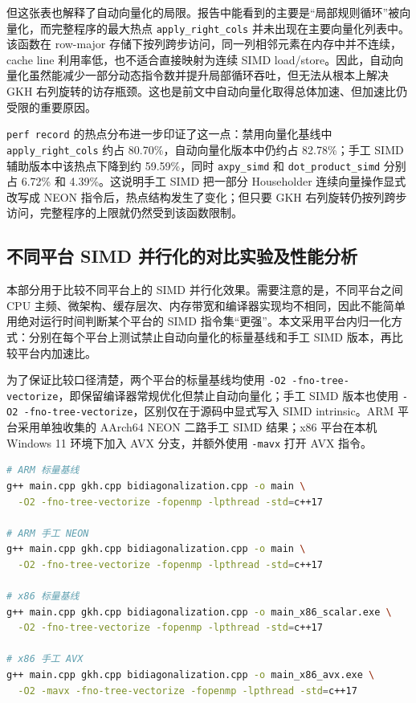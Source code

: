 \documentclass[UTF8,a4paper]{ctexart}
\begin{document}
但这张表也解释了自动向量化的局限。报告中能看到的主要是“局部规则循环”被向量化，而完整程序的最大热点 \texttt{apply\_right\_cols} 并未出现在主要向量化列表中。该函数在 row-major 存储下按列跨步访问，同一列相邻元素在内存中并不连续，cache line 利用率低，也不适合直接映射为连续 SIMD load/store。因此，自动向量化虽然能减少一部分动态指令数并提升局部循环吞吐，但无法从根本上解决 GKH 右列旋转的访存瓶颈。这也是前文中自动向量化取得总体加速、但加速比仍受限的重要原因。

\texttt{perf record} 的热点分布进一步印证了这一点：禁用向量化基线中 \texttt{apply\_right\_cols} 约占 80.70\%，自动向量化版本中仍约占 82.78\%；手工 SIMD 辅助版本中该热点下降到约 59.59\%，同时 \texttt{axpy\_simd} 和 \texttt{dot\_product\_simd} 分别占 6.72\% 和 4.39\%。这说明手工 SIMD 把一部分 Householder 连续向量操作显式改写成 NEON 指令后，热点结构发生了变化；但只要 GKH 右列旋转仍按列跨步访问，完整程序的上限就仍然受到该函数限制。

\subsection{不同平台 SIMD 并行化的对比实验及性能分析}
本部分用于比较不同平台上的 SIMD 并行化效果。需要注意的是，不同平台之间 CPU 主频、微架构、缓存层次、内存带宽和编译器实现均不相同，因此不能简单用绝对运行时间判断某个平台的 SIMD 指令集“更强”。本文采用平台内归一化方式：分别在每个平台上测试禁止自动向量化的标量基线和手工 SIMD 版本，再比较平台内加速比。

为了保证比较口径清楚，两个平台的标量基线均使用 \texttt{-O2 -fno-tree-vectorize}，即保留编译器常规优化但禁止自动向量化；手工 SIMD 版本也使用 \texttt{-O2 -fno-tree-vectorize}，区别仅在于源码中显式写入 SIMD intrinsic。ARM 平台采用单独收集的 AArch64 NEON 二路手工 SIMD 结果；x86 平台在本机 Windows 11 环境下加入 AVX 分支，并额外使用 \texttt{-mavx} 打开 AVX 指令。

\begin{algorithm}[H]
\begin{lstlisting}[language=bash]
# ARM 标量基线
g++ main.cpp gkh.cpp bidiagonalization.cpp -o main \
  -O2 -fno-tree-vectorize -fopenmp -lpthread -std=c++17

# ARM 手工 NEON
g++ main.cpp gkh.cpp bidiagonalization.cpp -o main \
  -O2 -fno-tree-vectorize -fopenmp -lpthread -std=c++17

# x86 标量基线
g++ main.cpp gkh.cpp bidiagonalization.cpp -o main_x86_scalar.exe \
  -O2 -fno-tree-vectorize -fopenmp -lpthread -std=c++17

# x86 手工 AVX
g++ main.cpp gkh.cpp bidiagonalization.cpp -o main_x86_avx.exe \
  -O2 -mavx -fno-tree-vectorize -fopenmp -lpthread -std=c++17
\end{lstlisting}
\caption{不同平台对比实验的编译命令}
\label{alg:platform-compile}
\end{algorithm}
\end{document}
